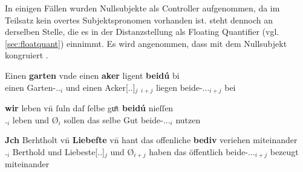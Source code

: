 \label{phsec:vbctrl}
In einigen Fällen wurden Nullsubjekte als Controller aufgenommen, da im
Teilsatz kein overtes Subjektspronomen vorhanden ist.  steht
dennoch an derselben Stelle, die es in der Distanzstellung als Floating
Quantifier (vgl. \cref{sec:floatquant}) einnimmt. Es wird angenommen, dass
 mit dem Nullsubjekt kongruiert
\autocites[siehe auch][419]{dalrymple2001}[210]{bresnanetal2016}.

\begin{exe}
\ex \label{ex:vvfinctrl}
	\begin{xlist}
	\ex \label{ex:vvfinctrl_1}
		\gll Einen \textbf{garten} vnde einen \textbf{aker} {} ligent
			\textbf{beidú} bi \textelp{} \\			
			einen Garten-\Acc.\Sg.\MascI{}$_i$ und einen
				Acker[\Acc.\Sg.\MascI]$_j$ \Rel$_{i+j}$ liegen
				beide-\Nom.\Pl.\NeutI.\St{}$_{i+j}$ bei {} \\
		\begin{taggedline}{\parencites(Freiburg i.\,Br., 1299)[\pno~3249, 417.4--5]{cao4}}
		\trans {}
		\end{taggedline}

	\ex \label{ex:vvfinctrl_2}
		\gll \textbf{wir} leben \textelp{} vn̄ {} ſuln daſ ſelbe guͦt
				\textbf{beidú} nieſſen \\				
			\Fpl\subMF.\Nom{}$_i$ leben {} und Ø$_i$ sollen das selbe Gut
				beide-\Nom.\Pl.\NeutMF.\St{}$_i$ nutzen \\
		\begin{taggedline}{\parencites(Neuenburg am Rhein, Kr.~Breisgau-Hochschwarzwald, 1299)[\pno~3376, 493.21--22]{cao4}}
		\trans {}
		\end{taggedline}

	\ex \label{ex:vvfinctrl_3}
		\gll \textbf{Jch} Berhtholt vn̄ \textbf{Liebeſte} \textelp{} vn̄
				{} hant das offenliche \textbf{bediv} veriehen
				miteinander \\				
			\Fsg\subM.\Nom{}$_i$ Berthold und Liebeste[\Nom.\Sg.\FemF]$_j$ {}
				und Ø$_{i+j}$ haben das öffentlich
				beide-\Nom.\Pl.\NeutMF.\St{}$_{i+j}$ bezeugt miteinander \\
		\begin{taggedline}{\parencites(Kl.~Niedermünster, Dépt.~Bas-Rhin, 1277)[\pno~N~150, 108.31--32]{cao5}}
		\trans {}
		\end{taggedline}


\end{xlist}
\end{exe}
